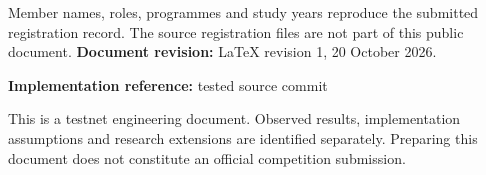 \begin{titlepage}
\small Member names, roles, programmes and study years reproduce the submitted registration record. The source registration files are not part of this public document.
\vfill
\normalsize\textbf{Document revision:} LaTeX revision 1, 20 October 2026.\par
\textbf{Implementation reference:} tested source commit\par
{}\par
\smallskip
\repo\par
\smallskip
\small This is a testnet engineering document. Observed results, implementation assumptions and research extensions are identified separately. Preparing this document does not constitute an official competition submission.
\end{titlepage}
\hypersetup{pageanchor=true}
